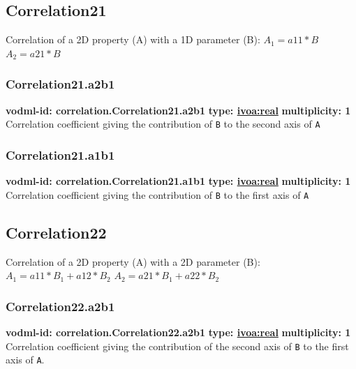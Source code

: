   \subsection{Correlation21}
  \label{sect:correlation.Correlation21}
    Correlation of a 2D property (A) with a 1D parameter (B): $A_1 = a11 * B$ $A_2 = a21 * B$

    \subsubsection{Correlation21.a2b1}
      \textbf{vodml-id: correlation.Correlation21.a2b1} \newline
      \textbf{type: \hyperref[sect:ivoa]{ivoa:real}} \newline
      \textbf{multiplicity: 1} \newline 
      Correlation coefficient giving the contribution of \texttt{B} to the second axis of \texttt{A}

    \subsubsection{Correlation21.a1b1}
      \textbf{vodml-id: correlation.Correlation21.a1b1} \newline
      \textbf{type: \hyperref[sect:ivoa]{ivoa:real}} \newline
      \textbf{multiplicity: 1} \newline 
      Correlation coefficient giving the contribution of \texttt{B} to the first axis of \texttt{A}

  \subsection{Correlation22}
  \label{sect:correlation.Correlation22}
    Correlation of a 2D property (A) with a 2D parameter (B): $A_1 = a11 * B_1 + a12 * B_2 $ $A_2 = a21 * B_1 + a22 * B_2 $

    \subsubsection{Correlation22.a2b1}
      \textbf{vodml-id: correlation.Correlation22.a2b1} \newline
      \textbf{type: \hyperref[sect:ivoa]{ivoa:real}} \newline
      \textbf{multiplicity: 1} \newline 
      Correlation coefficient giving the contribution of the second axis of \texttt{B} to the first axis of \texttt{A}.

